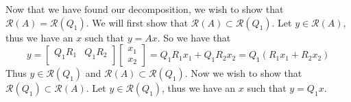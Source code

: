 \documentclass{exam}
\begin{document}
  \begin{solution}

  Now that we have found our decomposition, we wish to show that $\mathcal{R}(A) = \mathcal{R}(Q_1)$. We will first show that $\mathcal{R}(A) \subset \mathcal{R}(Q_1)$. Let $y \in \mathcal{R}(A)$, thus we have an $x$ such that $y = Ax$. So we have that
      \[
         y = 
         \begin{bmatrix}
             Q_1R_1 & Q_1R_2 \\
         \end{bmatrix}
         \begin{bmatrix}
             x_1 \\
             x_2
         \end{bmatrix}
         = 
         Q_1R_1x_1 + Q_1R_2x_2 = Q_1(R_1x_1 + R_2x_2)
      \]
      Thus $y \in \mathcal{R}(Q_1)$ and $\mathcal{R}(A) \subset \mathcal{R}(Q_1)$. Now we wish to show that $\mathcal{R}(Q_1) \subset \mathcal{R}(A)$. Let $y \in \mathcal{R}(Q_1)$, thus we have an $x$ such that $y = Q_1x$.
  \end{solution}
\end{document}
